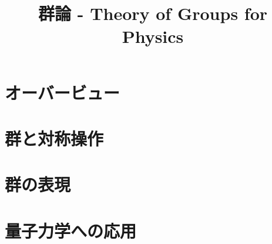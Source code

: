 \documentclass[a4paper]{jsreport}
\title{群論 - Theory of Groups for Physics}
\begin{document}
    \maketitle

    \tableofcontents

    \chapter{オーバービュー}
    \chapter{群と対称操作}
    \chapter{群の表現}
    \chapter{量子力学への応用}
\end{document}
